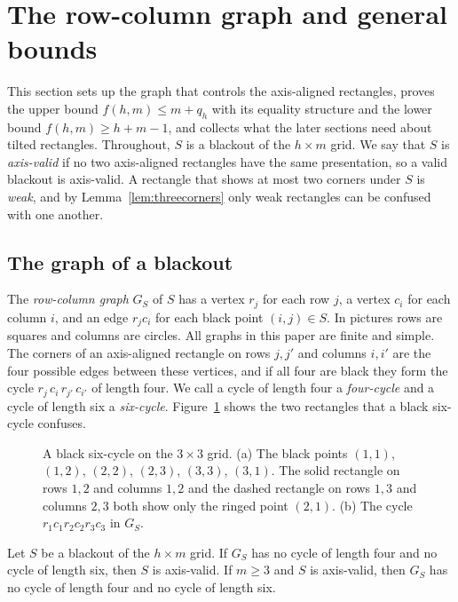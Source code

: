 \section{The row-column graph and general bounds}\label{sec:graph}

This section sets up the graph that controls the axis-aligned rectangles, proves the upper bound $f(h,m)\le m+q_h$ with its equality structure and the lower bound $f(h,m)\ge h+m-1$, and collects what the later sections need about tilted rectangles. Throughout, $S$ is a blackout of the $h\times m$ grid. We say that $S$ is \emph{axis-valid} if no two axis-aligned rectangles have the same presentation, so a valid blackout is axis-valid. A rectangle that shows at most two corners under $S$ is \emph{weak}, and by Lemma~\ref{lem:threecorners} only weak rectangles can be confused with one another.

\subsection{The graph of a blackout}

The \emph{row-column graph} $G_S$ of $S$ has a vertex $r_j$ for each row $j$, a vertex $c_i$ for each column $i$, and an edge $r_jc_i$ for each black point $(i,j)\in S$. In pictures rows are squares and columns are circles. All graphs in this paper are finite and simple. The corners of an axis-aligned rectangle on rows $j,j'$ and columns $i,i'$ are the four possible edges between these vertices, and if all four are black they form the cycle $r_j\,c_i\,r_{j'}\,c_{i'}$ of length four. We call a cycle of length four a \emph{four-cycle} and a cycle of length six a \emph{six-cycle}. Figure~\ref{fig:c6} shows the two rectangles that a black six-cycle confuses.

\begin{figure}[t]
\centering

\caption{A black six-cycle on the $3\times3$ grid. (a) The black points $(1,1)$, $(1,2)$, $(2,2)$, $(2,3)$, $(3,3)$, $(3,1)$. The solid rectangle on rows $1,2$ and columns $1,2$ and the dashed rectangle on rows $1,3$ and columns $2,3$ both show only the ringed point $(2,1)$. (b) The cycle $r_1c_1r_2c_2r_3c_3$ in $G_S$.}
\label{fig:c6}
\end{figure}

\begin{lemma}\label{lem:girth}
Let $S$ be a blackout of the $h\times m$ grid. If $G_S$ has no cycle of length four and no cycle of length six, then $S$ is axis-valid. If $m\ge3$ and $S$ is axis-valid, then $G_S$ has no cycle of length four and no cycle of length six.
\end{lemma}

